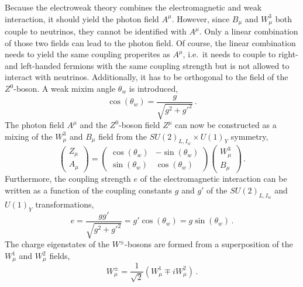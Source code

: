 Because the electroweak theory combines the electromagnetic and weak interaction, it should yield the photon field $A^\mu$.
However, since $B_\mu$ and $W_\mu^3$ both couple to neutrinos, they cannot be identified with $A^\mu$.
Only a linear combination of those two fields can lead to the photon field.
Of course, the linear combination needs to yield the same coupling properites as $A^\mu$, i.e.\ it needs to couple to
right- and left-handed fermions with the same coupling strength but is not allowed to interact with neutrinos.
Additionally, it has to be orthogonal to the field of the $Z^0$-boson.
A weak mixim angle $\theta_w$ is introduced,
\begin{equation}
    \cos \left( \theta_w \right) = \frac{g}{\sqrt{g^2 + {g'}^2}} \,.
\end{equation}
The photon field $A^\mu$ and the $Z^0$-boson field $Z^\mu$ can now be constructed as a mixing of the $W_\mu^3$ and $B_\mu$ field from the
$SU{(2)}_{L,I_w} \times U{(1)}_Y$ symmetry,
\begin{equation}
    \label{eq:theory:ew:zafield}
    \begin{pmatrix}
        Z_\mu \\ A_\mu
    \end{pmatrix}
    =
    \begin{pmatrix}
        \cos \left(\theta_w\right) & -\sin \left(\theta_w\right) \\
        \sin \left(\theta_w\right) & \cos \left(\theta_w\right)
    \end{pmatrix}
    \begin{pmatrix}
        W_\mu^3 \\ B_\mu
    \end{pmatrix} \,.
\end{equation}
Furthermore, the coupling strength $e$ of the electromagnetic interaction can be written as a function
of the coupling constants $g$ and $g'$ of the $SU{(2)}_{L,I_w}$ and $U{(1)}_Y$ transformations,
\begin{equation}
    e = \frac{g g'}{\sqrt{g^2 + {g'}^2}} = g' \cos \left(\theta_w\right) = g \sin \left(\theta_w\right) \,.
\end{equation}
The charge eigenstates of the $W^\pm$-bosons are formed from a superposition of the $W_\mu^1$ and $W_\mu^2$ fields,
\begin{equation}
    \label{eq:theory:ew:wfield}
    W^\pm_\mu = \frac{1}{\sqrt{2}} \left(W_\mu^1 \mp i W_\mu^2 \right) \,.
\end{equation}


